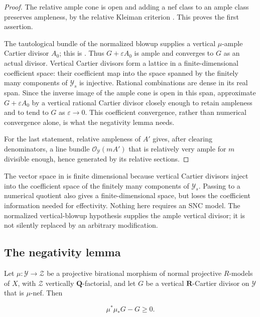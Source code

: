 \begin{proof}
The relative ample cone is open and adding a nef class to an ample class
preserves ampleness, by the relative Kleiman criterion
\cite[Section~1.4]{KM08}.  This proves the first assertion.

The tautological bundle of the normalized blowup supplies a vertical
$\mu$-ample Cartier divisor $A_0$; this is
\cite[Lemma~1.4]{BFJ16}.  Thus $G+\varepsilon A_0$ is ample and converges
to $G$ as an actual divisor.  Vertical Cartier divisors form a lattice in
a finite-dimensional coefficient space: their coefficient map into the
space spanned by the finitely many components of $\mathcal Y_s$ is
injective.  Rational combinations are dense in its real span.  Since the
inverse image of the ample cone is open in this span, approximate
$G+\varepsilon A_0$ by a vertical rational Cartier divisor closely enough
to retain ampleness and to tend to $G$ as $\varepsilon\to0$.
This coefficient convergence, rather than numerical convergence alone, is
what the negativity lemma needs.

For the last statement, relative ampleness of $A'$ gives, after
clearing denominators, a line bundle $\mathcal O_{\mathcal Y}(mA')$ that is
relatively very ample for $m$ divisible enough, hence generated by its
relative sections.
\end{proof}

\begin{remark}
\label{rem:ch22-nef-approximation-finite-dimensional}
The vector space in  is finite dimensional
because vertical Cartier divisors inject into the coefficient space of
the finitely many components of $\mathcal Y_s$.  Passing to a numerical
quotient also gives a finite-dimensional space, but loses the coefficient
information needed for effectivity.  Nothing here requires an SNC model.
The normalized vertical-blowup hypothesis supplies the ample vertical
divisor; it is not silently replaced by an arbitrary modification.
\end{remark}

\subsection{The negativity lemma}

\begin{lemma}
\label{lem:ch22-negativity}
Let $\mu:\mathcal Y\to\mathcal Z$ be a projective birational morphism of
normal projective $R$-models of $X$, with $\mathcal Z$ vertically
$\mathbf Q$-factorial, and let $G$ be a vertical $\mathbf R$-Cartier
divisor on $\mathcal Y$ that is $\mu$-nef.  Then

\[
                 \mu^*\mu_*G-G\geq0 .
\tag{22.31}\label{eq:ch22-negativity}
\]
\end{lemma}

